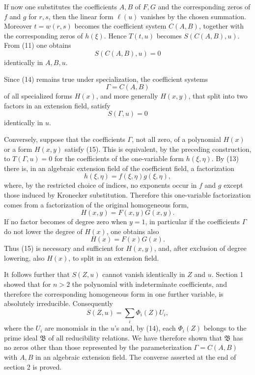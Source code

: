 \documentclass[12pt]{article}
\begin{document}
If now one substitutes the coefficients $A,B$ of $F,G$ and the corresponding zeros of $f$ and $g$ for $r,s$, then the linear form $\ell(u)$ vanishes by the chosen summation. Moreover $t=w(r,s)$ becomes the coefficient system $C(A,B)$, together with the corresponding zeros of $h(\xi)$. Hence $T(t,u)$ becomes $S(C(A,B),u)$. From (11) one obtains
\begin{equation}
  S(C(A,B),u)=0                                                   \tag{14}
\end{equation}
identically in $A,B,u$.

Since (14) remains true under specialization, the coefficient systems
\[
  \Gamma=C(A,B)
\]
of all specialized forms $H(x)$, and more generally $H(x,y)$, that split into two factors in an extension field, satisfy
\begin{equation}
  S(\Gamma,u)=0                                                   \tag{15}
\end{equation}
identically in $u$.

Conversely, suppose that the coefficients $\Gamma$, not all zero, of a polynomial $H(x)$ or a form $H(x,y)$ satisfy (15). This is equivalent, by the preceding construction, to $T(\Gamma,u)=0$ for the coefficients of the one-variable form $h(\xi,\eta)$. By (13) there is, in an algebraic extension field of the coefficient field, a factorization
\[
  h(\xi,\eta)=f(\xi,\eta)g(\xi,\eta),
\]
where, by the restricted choice of indices, no exponents occur in $f$ and $g$ except those induced by Kronecker substitution. Therefore this one-variable factorization comes from a factorization of the original homogeneous form,
\[
  H(x,y)=F(x,y)G(x,y).
\]
If no factor becomes of degree zero when $y=1$, in particular if the coefficients $\Gamma$ do not lower the degree of $H(x)$, one obtains also
\[
  H(x)=F(x)G(x).
\]
Thus (15) is necessary and sufficient for $H(x,y)$, and, after exclusion of degree lowering, also $H(x)$, to split in an extension field.

It follows further that $S(Z,u)$ cannot vanish identically in $Z$ and $u$. Section 1 showed that for $n>2$ the polynomial with indeterminate coefficients, and therefore the corresponding homogeneous form in one further variable, is absolutely irreducible. Consequently
\[
  S(Z,u)=\sum_i \Phi_i(Z)U_i,
\]
where the $U_i$ are monomials in the $u$'s and, by (14), each $\Phi_i(Z)$ belongs to the prime ideal $\mathfrak B$ of all reducibility relations. We have therefore shown that $\mathfrak B$ has no zeros other than those represented by the parameterization $\Gamma=C(A,B)$ with $A,B$ in an algebraic extension field. The converse asserted at the end of section 2 is proved.
\end{document}
